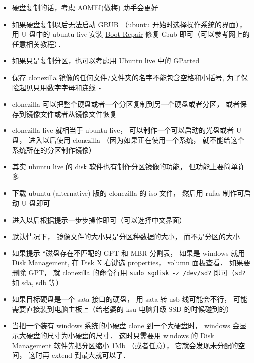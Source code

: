 
\begin{issues}
\issueDraft
\end{issues}

\begin{itemize}
\item 硬盘复制的话，考虑 AOMEI(傲梅) 助手会更好
\item 如果硬盘复制以后无法启动 GRUB （ubuntu 开始时选择操作系统的界面）， 用 U 盘中的 ubuntu live 安装 \href{https://help.ubuntu.com/community/Boot-Repair}{Boot Repair} 修复 Grub 即可（可以参考网上的任意相关教程）．
\item 如果只是复制分区，也可以考虑用 Ubuntu live 中的 GParted
\item 保存 clonezilla 镜像的任何文件/文件夹的名字不能包含空格和小括号, 为了保险起见只用数字字母和连线 \verb`-`
\item clonezilla 可以把整个硬盘或者一个分区复制到另一个硬盘或者分区， 或者保存到镜像文件或者从镜像文件恢复
\item clonezilla live 就相当于 ubuntu live， 可以制作一个可以启动的光盘或者 U 盘， 进入以后使用 clonezilla （因为如果正在使用一个系统， 就不能给这个系统所在的分区制作镜像）
\item 其实 ubuntu live 的 disk 软件也有制作分区镜像的功能， 但功能上要简单许多

\item 下载 ubuntu (alternative) 版的 clonezilla 的 iso 文件， 然后用 rufas 制作可启动 U 盘即可
\item 进入以后根据提示一步步操作即可（可以选择中文界面）
\item 默认情况下， 镜像文件的大小只是分区种数据的大小， 而不是分区的大小

\item 如果提示 “磁盘存在不匹配的 GPT 和 MBR 分割表， 如果是 windows 就用 Disk Management, 在 Disk X 右键选 properties， volumn 面板查看． 如果要删除 GPT， 就 clonezilla 的命令行用 \verb|sudo sgdisk -z /dev/sd?| 即可（\verb|sd?| 如 sda, sdb 等）
\item 如果目标硬盘是一个 sata 接口的硬盘， 用 sata 转 usb 线可能会不行， 可能需要直接装到电脑主板上（给老婆的 ksu 电脑升级 SSD 的时候碰到的）
\item 当把一个装有 windows 系统的小硬盘 clone 到一个大硬盘时， windows 会显示大硬盘的尺寸为小硬盘的尺寸． 这时只需要用 windows 的 Disk Management 软件先把分区缩小 1Mb （或者任意）， 它就会发现未分配的空间， 这时再 extend 到最大就可以了．
\end{itemize}
